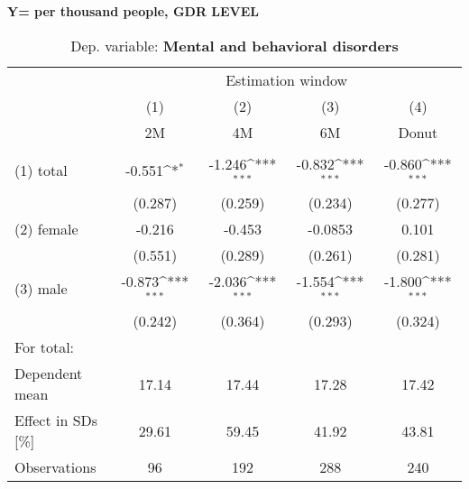 \documentclass{scrartcl} %
\begin{document}
\newpage
\textbf{Y= per thousand people, GDR LEVEL}
 \begin{table}[htbp] \centering 
 \begin{threeparttable} \centering 
 \caption{Dep. variable: \textbf{Mental and behavioral disorders}} 
 {\def\sym#1{\ifmmode^{#1}\else\(^{#1}\)\fi} 
 \begin{tabular}{l*{4}{c}} \toprule & \multicolumn{4}{c}{Estimation window} \\ \cmidrule(lr){2-5}
	&\multicolumn{1}{c}{(1)}&\multicolumn{1}{c}{(2)}&\multicolumn{1}{c}{(3)}&\multicolumn{1}{c}{(4)}\\
    &\multicolumn{1}{c}{2M}&\multicolumn{1}{c}{4M}&\multicolumn{1}{c}{6M}&\multicolumn{1}{c}{Donut}\\
	\midrule
\\
(1) total	& -0.551\sym{*} 	&  -1.246\sym{***} & 	-0.832\sym{***}  & 	-0.860\sym{***} \\
			& (0.287) 	&  (0.259) 	 &	(0.234) 	& (0.277) \\
(2) female	& -0.216 	&  -0.453	 &	-0.0853 	& 0.101 \\
			& (0.551) 	&  (0.289) 	 &	(0.261)	 	& (0.281) \\
(3) male 	& -0.873\sym{***}	&  -2.036\sym{***} & 	-1.554\sym{***} & 	-1.800\sym{***} \\
 		 	& (0.242) 	&  (0.364) 	 &	(0.293) 	& (0.324) \\
\midrule
For total: \\ 
Dependent mean &    17.14 & 17.44 & 17.28 & 17.42 \\  
Effect in SDs [\%]  &  29.61 & 59.45 &  41.92 & 43.81 \\ 
Observations & 96 & 192 & 288 & 240 \\  
\bottomrule
\end{tabular}}
\end{threeparttable} \end{table} 
\end{document}

